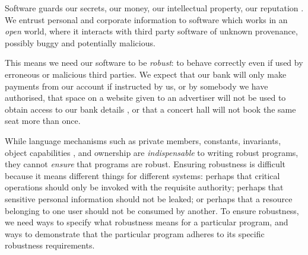 Software guards our secrets, our money, our intellectual property,
our reputation \cite{covern}.  We entrust personal and
corporate information to software which works in an \emph{open} world, 
where  it interacts with 
third party software of unknown provenance, possibly buggy and potentially malicious.

This means we need our software to be \emph{robust}:
to behave correctly even if  used 
by erroneous or malicious third parties.
We expect that our bank will only make payments 
from our account if instructed by us, or by somebody we have authorised, 
that space on a website given to an advertiser will not be used
to obtain access to our bank details \cite{cwe}, or that a
concert hall will not book the same seat more than once.



While language mechanisms such as private members,  constants, invariants, 
object capabilities \cite{MillerPhD}, and 
ownership \cite{ownalias} are
\textit{indispensable} to writing robust
programs, they cannot \textit{ensure} that programs are robust.
Ensuring robustness is difficult because it means 
different things for different systems: perhaps
that critical operations should only be invoked with the requisite authority;
perhaps that sensitive personal information should not be leaked; 
or perhaps that a resource belonging to one user should not be consumed by another. 
%
To ensure robustness, we need ways to specify what robustness means for a 
particular program, and ways to demonstrate that the particular program 
adheres to its specific robustness requirements.

